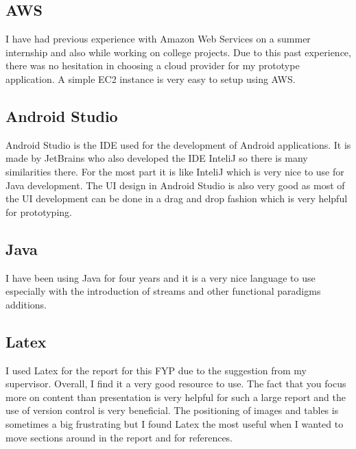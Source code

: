 \subsection*{AWS}
I have had previous experience with Amazon Web Services on a summer internship and also while working on college projects.
Due to this past experience, there was no hesitation in choosing a cloud provider for my prototype application.
A simple EC2 instance is very easy to setup using AWS.

\subsection*{Android Studio}
Android Studio is the IDE used for the development of Android applications.
It is made by JetBrains who also developed the IDE InteliJ so there is many similarities there.
For the most part it is like InteliJ which is very nice to use for Java development.
The UI design in Android Studio is also very good as most of the UI development can be done in a drag and drop fashion which is very helpful for prototyping.

\subsection*{Java}
I have been using Java for four years and it is a very nice language to use especially with the introduction of streams and other functional paradigms additions.

\subsection*{Latex}
I used Latex for the report for this FYP due to the suggestion from my supervisor.
Overall, I find it a very good resource to use.
The fact that you focus more on content than presentation is very helpful for such a large report and the use of version control is very beneficial.
The positioning of images and tables is sometimes a big frustrating but I found Latex the most useful when I wanted to move sections around in the report and for references.